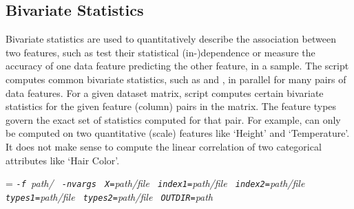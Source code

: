 \subsection{Bivariate Statistics}

\smallskip

Bivariate statistics are used to quantitatively describe the association between
two features, such as test their statistical (in-)dependence or measure
the accuracy of one data feature predicting the other feature, in a sample.
The \BivarScriptName{} script computes common bivariate statistics,
such as \NameStatR{} and \NameStatChi{}, in parallel for many pairs
of data features.  For a given dataset matrix, script \BivarScriptName{} computes
certain bivariate statistics for the given feature (column) pairs in the
matrix.  The feature types govern the exact set of statistics computed for that pair.
For example, \NameStatR{} can only be computed on two quantitative (scale)
features like `Height' and `Temperature'. 
It does not make sense to compute the linear correlation of two categorical attributes
like `Hair Color'. 


\smallskip
{}
\smallskip

{\hangindent=\parindent\noindent\it%
{\tt{}-f }path/\/\BivarScriptName{}
{\tt{} -nvargs}
{\tt{} X=}path/file
{\tt{} index1=}path/file
{\tt{} index2=}path/file
{\tt{} types1=}path/file
{\tt{} types2=}path/file
{\tt{} OUTDIR=}path

}


